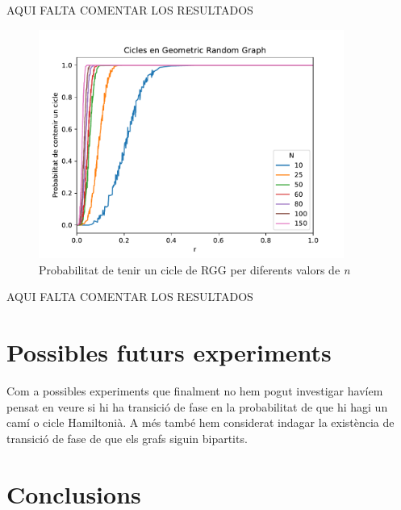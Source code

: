AQUI FALTA COMENTAR LOS RESULTADOS

\begin{figure}[H]
    \centering
    \includegraphics[width=10cm]{plots/GRG_cicle.pdf}
    \caption{Probabilitat de tenir un cicle de RGG per diferents valors de \textit{n}}
    \label{fig:connect_04}
\end{figure}

AQUI FALTA COMENTAR LOS RESULTADOS

\section{Possibles futurs experiments}
Com a possibles experiments que finalment no hem pogut investigar havíem pensat en veure si hi ha transició de fase en la probabilitat de que hi hagi un camí o cicle Hamiltonià. A més també hem considerat indagar la existència de transició de fase de que els grafs siguin bipartits.


\section{Conclusions}

\pagebreak

\printbibliography


